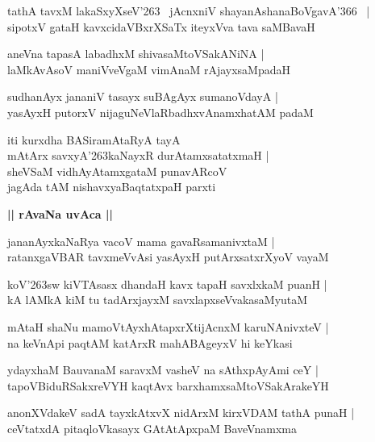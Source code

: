 \documentclass[twoside,12pt,openright]{book}
\def\S{\char'263}
\newcounter{shloka}[chapter]
\def\uvaca#1{\centerline{{\large\textbf{#1}}}}
\begin{document}
\begin{shloka}%
tathA tavxM lakaSxyXseV\S ~ jAcnxniV shayanAshanaBoVgavA\char'366 ~|\\
sipotxV gataH kavxcidaVBxrXSaTx iteyxVva tava saMBavaH
\end{shloka}

\begin{shloka}%
aneVna tapasA labadhxM shivasaMtoVSakANiNA |\\
laMkAvAsoV maniVveVgaM vimAnaM rAjayxsaMpadaH
\end{shloka}

\begin{shloka}%
sudhanAyx jananiV tasayx suBAgAyx sumanoVdayA |\\
yasAyxH putorxV nijaguNeVlaRbadhxvAnamxhatAM padaM 
\end{shloka}

\begin{shloka}%
iti kurxdha BASiramAtaRyA tayA \\
mAtArx savxyA\S kaNayxR durAtamxsatatxmaH |\\
sheVSaM vidhAyAtamxgataM punavARcoV\\
jagAda tAM nishavxyaBaqtatxpaH parxti
\end{shloka}

\uvaca{|| rAvaNa uvAca ||}

\begin{shloka}%
jananAyxkaNaRya vacoV mama gavaRsamanivxtaM |\\
ratanxgaVBAR tavxmeVvAsi yasAyxH putArxsatxrXyoV vayaM 
\end{shloka}

\begin{shloka}%
koV\S sw kiVTAsasx dhandaH kavx tapaH savxlxkaM puanH |\\
kA lAMkA kiM tu tadArxjayxM savxlapxseVvakasaMyutaM 
\end{shloka}

\begin{shloka}%
mAtaH shaNu mamoVtAyxhAtapxrXtijAcnxM karuNAnivxteV |\\
na keVnApi paqtAM katArxR mahABAgeyxV hi keYkasi
\end{shloka}

\begin{shloka}%
ydayxhaM BauvanaM saravxM vasheV na sAthxpAyAmi ceY |\\
tapoVBiduRSakxreVYH kaqtAvx barxhamxsaMtoVSakArakeYH 
\end{shloka}

\begin{shloka}%
anonXVdakeV sadA tayxkAtxvX nidArxM kirxVDAM tathA punaH |\\
ceVtatxdA pitaqloVkasayx GAtAtApxpaM BaveVnamxma 
\end{shloka}
\end{document}
